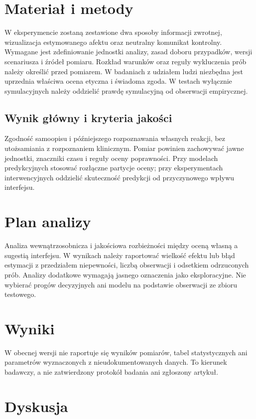 \documentclass[11pt,a4paper]{article}
\begin{document}
\section{Materiał i metody}

W eksperymencie zostaną zestawione dwa sposoby informacji zwrotnej, wizualizacja estymowanego afektu oraz neutralny komunikat kontrolny. Wymagane jest zdefiniowanie jednostki analizy, zasad doboru przypadków, wersji scenariusza i źródeł pomiaru. Rozkład warunków oraz reguły wykluczenia prób należy określić przed pomiarem. W badaniach z udziałem ludzi niezbędna jest uprzednia właściwa ocena etyczna i świadoma zgoda. W testach wyłącznie symulacyjnych należy oddzielić prawdę symulacyjną od obserwacji empirycznej.

\subsection{Wynik główny i kryteria jakości}

Zgodność samoopisu i późniejszego rozpoznawania własnych reakcji, bez utożsamiania z rozpoznaniem klinicznym. Pomiar powinien zachowywać jawne jednostki, znaczniki czasu i reguły oceny poprawności. Przy modelach predykcyjnych stosować rozłączne partycje oceny; przy eksperymentach interwencyjnych oddzielić skuteczność predykcji od przyczynowego wpływu interfejsu.

\section{Plan analizy}

Analiza wewnątrzosobnicza i jakościowa rozbieżności między oceną własną a sugestią interfejsu. W wynikach należy raportować wielkość efektu lub błąd estymacji z przedziałem niepewności, liczbą obserwacji i odsetkiem odrzuconych prób. Analizy dodatkowe wymagają jasnego oznaczenia jako eksploracyjne. Nie wybierać progów decyzyjnych ani modelu na podstawie obserwacji ze zbioru testowego.

\section{Wyniki}

W obecnej wersji nie raportuje się wyników pomiarów, tabel statystycznych ani parametrów wyznaczonych z nieudokumentowanych danych. To kierunek badawczy, a nie zatwierdzony protokół badania ani zgłoszony artykuł.

\section{Dyskusja}
\end{document}
